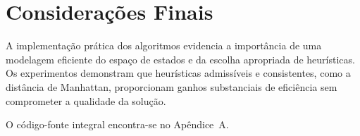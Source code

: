 \section{Considerações Finais}  
A implementação prática dos algoritmos evidencia a importância de uma modelagem eficiente do espaço de estados e da escolha apropriada de heurísticas. Os experimentos demonstram que heurísticas admissíveis e consistentes, como a distância de Manhattan, proporcionam ganhos substanciais de eficiência sem comprometer a qualidade da solução.  
  
O código-fonte integral encontra-se no Apêndice~A.  
  
